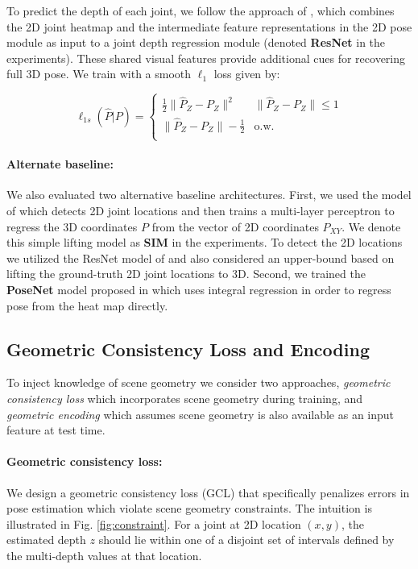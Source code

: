 \documentclass[times,referee,twocolumn,final,authoryear]{elsarticle}
\begin{document}
To predict the depth of each joint, we follow the approach of
\cite{Zhou_2017_ICCV}, which combines the 2D joint heatmap and the
intermediate feature representations in the 2D pose module as input to a joint
depth regression module (denoted {\bf ResNet} in the experiments). These shared 
visual features provide additional cues for recovering full 3D pose. We train 
with a smooth $\ell_1$ loss
\cite{fasterRCNN} given by:

\begin{equation}
  \ell_{1s}({\hat P}|P) =
    \begin{cases}
      \text{$\frac{1}{2} \| {\hat P}_Z- P_Z \|^2$ }  & \| {\hat P}_Z- P_Z \|\leq 1\\
      \text{$\| {\hat P}_Z - P_Z \| - \frac{1}{2}$} &  \text{o.w.}\\
    \end{cases}       
  \label{eqn:l1}
\end{equation}

\paragraph{Alternate baseline:} We also evaluated two alternative 
baseline architectures. First, we used the model of \cite{simple} which detects 2D joint 
locations and then trains a multi-layer perceptron to regress the 3D coordinates $P$ from 
the vector of 2D coordinates $P_{XY}$. We denote this simple lifting model as {\bf SIM} 
in the experiments.  To detect the 2D locations we utilized the ResNet model of \cite{xiao2018simple} 
and also considered an upper-bound based on lifting the ground-truth 2D joint locations to 3D.
Second, we trained the {\bf PoseNet} model proposed in \cite{rootnet} which uses integral 
regression \citep{integral} in order to regress pose from the heat map directly.   


\subsection{Geometric Consistency Loss and Encoding}

To inject knowledge of scene geometry we consider two approaches, {\em 
geometric consistency loss} which incorporates scene geometry during training, 
and {\em geometric encoding} which assumes scene geometry is also available as 
an input feature at test time.

\paragraph{Geometric consistency loss:}
We design a geometric consistency loss (GCL) that specifically penalizes errors in 
pose estimation which violate scene geometry constraints. The intuition is illustrated
in Fig. \ref{fig:constraint}. For a joint at 2D location $(x,y)$, the estimated depth
$z$ should lie within one of a disjoint set of intervals defined by the multi-depth
values at that location.
\end{document}
